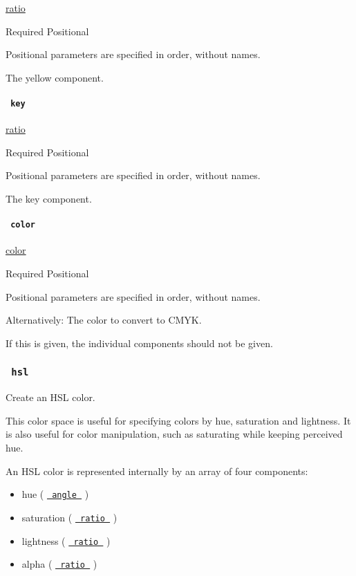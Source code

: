 \href{/docs/reference/layout/ratio/}{ratio}

{Required} {{ Positional }}

\label{definitions-cmyk-yellow-positional-tooltip}
Positional parameters are specified in order, without names.

The yellow component.

\paragraph{\texorpdfstring{\texttt{\ key\ }}{ key }}\label{definitions-cmyk-key}

\href{/docs/reference/layout/ratio/}{ratio}

{Required} {{ Positional }}

\label{definitions-cmyk-key-positional-tooltip}
Positional parameters are specified in order, without names.

The key component.

\paragraph{\texorpdfstring{\texttt{\ color\ }}{ color }}\label{definitions-cmyk-color}

\href{/docs/reference/visualize/color/}{color}

{Required} {{ Positional }}

\label{definitions-cmyk-color-positional-tooltip}
Positional parameters are specified in order, without names.

Alternatively: The color to convert to CMYK.

If this is given, the individual components should not be given.

\subsubsection{\texorpdfstring{\texttt{\ hsl\ }}{ hsl }}\label{definitions-hsl}

Create an HSL color.

This color space is useful for specifying colors by hue, saturation and
lightness. It is also useful for color manipulation, such as saturating
while keeping perceived hue.

An HSL color is represented internally by an array of four components:

\begin{itemize}
\tightlist
\item
  hue ( \href{/docs/reference/layout/angle/}{\texttt{\ angle\ }} )
\item
  saturation ( \href{/docs/reference/layout/ratio/}{\texttt{\ ratio\ }}
  )
\item
  lightness ( \href{/docs/reference/layout/ratio/}{\texttt{\ ratio\ }} )
\item
  alpha ( \href{/docs/reference/layout/ratio/}{\texttt{\ ratio\ }} )
\end{itemize}

